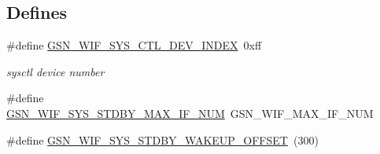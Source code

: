 \subsection*{Defines}
\begin{DoxyCompactItemize}
\item 
\#define \hyperlink{a00639_ga89d2e01544259ce81d97d4161d5f3c51}{GSN\_\-WIF\_\-SYS\_\-CTL\_\-DEV\_\-INDEX}~0xff
\begin{DoxyCompactList}\small\item\em sysctl device number \end{DoxyCompactList}\item 
\#define \hyperlink{a00612_aaa47aebadfeb0f51841b56c5dfa56bf4}{GSN\_\-WIF\_\-SYS\_\-STDBY\_\-MAX\_\-IF\_\-NUM}~GSN\_\-WIF\_\-MAX\_\-IF\_\-NUM
\item 
\#define \hyperlink{a00612_a4398fd372a03b37ae3fdc1ba14232e94}{GSN\_\-WIF\_\-SYS\_\-STDBY\_\-WAKEUP\_\-OFFSET}~(300)
\end{DoxyCompactItemize}
